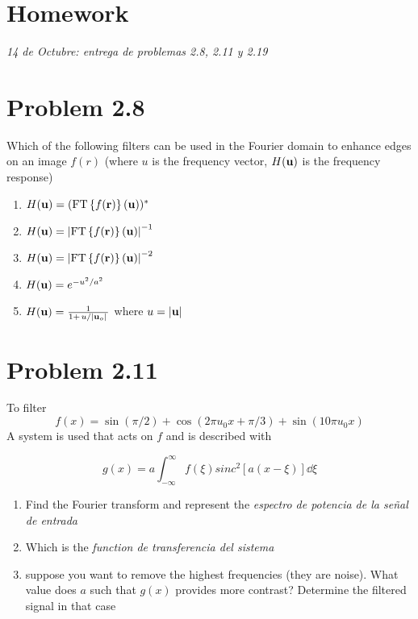 \documentclass[../main/main.tex]{subfiles}
\begin{document}
\section{Homework}

\emph{14 de Octubre: entrega de problemas 2.8, 2.11 y 2.19}

\section*{Problem 2.8}

\renewcommand{\vec}[1]{\vb{#1}}
\renewcommand{\u}{\vec{u}}
\renewcommand{\r}{\vec{r}}
\renewcommand{\v}{\vec{v}}
\newcommand{\FT}[1]{\textrm{FT}\left\{#1\right\}}

Which of the following filters can be used in the Fourier domain to enhance edges on an image $f(r)$ (where $u$ is the frequency vector, $H(\u)$ is the frequency response)

\begin{enumerate}
	\item $H(\u) = (\FT{f(\r)}(\u))^{*}$
	\item $H(\u) = \abs{\FT{f(\r)}(\u)}^{-1}$
	\item $H(\u) = \abs{\FT{f(\r)}(\u)}^{-2}$
	\item $H(\u) = e^{-u^{2}/a^{2}}$
	\item $H(\u) = \frac{1}{1+\flatfrac {u}{|\u_{o}|}}$ where $u = \abs{\u}$

\end{enumerate}

\section*{Problem 2.11}

To filter
\begin{equation*}
f(x) = \sin(\pi/2) + \cos(2\pi u_{0}x + \pi/3) + \sin(10\pi u_{0} x)
\end{equation*}
A system is used that acts on $f$ and is described with

\begin{equation*}
g(x) = a \int_{-\infty}^{\infty} %
f(\xi) sinc^{2}\left[a(x - \xi)\right]\dd{\xi}
\end{equation*}

\begin{enumerate}
	\item Find the Fourier transform and represent the \emph{espectro de potencia de la señal de entrada}
	\item Which is the \emph{function de transferencia del sistema}
	\item suppose you want to remove the highest frequencies (they are noise). What value does $a$ such that $g(x)$ provides more contrast? Determine the filtered signal in that case

\end{enumerate}
\end{document}
